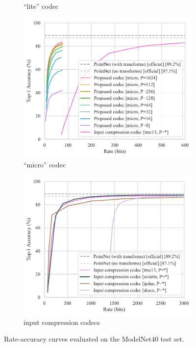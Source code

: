 {\begin{figure}[htbp]
\begin{subfigure}[b]{\subfigurehspace}
    \caption{``lite'' codec}
    \label{fig:rate-accuracy/lite}
  \end{subfigure}%
  \hfill%
  \begin{subfigure}[b]{\subfigurehspace}
    \centering
    \includegraphics[width=\linewidth]{img/point_cloud_compression/rate_accuracy/modelnet40_micro.pdf}
    \caption{``micro'' codec}
    \label{fig:rate-accuracy/micro}
  \end{subfigure}%
  \hfill%
  \begin{subfigure}[b]{\subfigurehspace}
    \centering
    \includegraphics[width=\linewidth]{img/point_cloud_compression/rate_accuracy/modelnet40_input-compression.pdf}
    \caption{input compression codecs}
    \label{fig:rate-accuracy/input-compression}
  \end{subfigure}%
  \caption{Rate-accuracy curves evaluated on the ModelNet40 test set.}
  \label{fig:rate-accuracy}
\end{figure}
}


